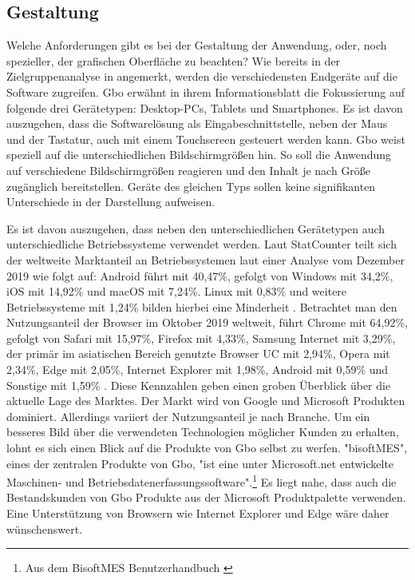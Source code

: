 \subsection{Gestaltung}
\label{subsec:gestaltung}
Welche Anforderungen gibt es bei der Gestaltung der Anwendung, oder, noch spezieller, 
der grafischen Oberfläche zu beachten? Wie bereits in der Zielgruppenanalyse in 
angemerkt, werden die verschiedensten Endgeräte auf die Software zugreifen.
Gbo erwähnt in ihrem Informationsblatt die Fokussierung auf folgende
drei Gerätetypen: Desktop-PCs, Tablets und Smartphones. Es ist davon auszugehen, dass die
Softwarelösung als Eingabeschnittstelle, neben der Maus und der Tastatur, auch mit einem Touchscreen
gesteuert werden kann. Gbo weist speziell auf die unterschiedlichen Bildschirmgrößen
hin. So soll die Anwendung auf verschiedene Bildschirmgrößen reagieren und den Inhalt je nach
Größe zugänglich bereitstellen. Geräte des gleichen Typs sollen keine signifikanten Unterschiede
in der Darstellung aufweisen.

Es ist davon auszugehen, dass neben den unterschiedlichen Gerätetypen auch unterschiedliche
Betriebssysteme verwendet werden. Laut StatCounter teilt sich der weltweite Marktanteil
an Betriebssystemen laut einer Analyse vom Dezember 2019 wie folgt auf: Android führt mit
40,47\%, gefolgt von Windows mit 34,2\%, iOS mit 14,92\% und macOS mit 7,24\%. Linux mit 0,83\% und weitere
Betriebssysteme mit 1,24\% bilden hierbei eine Minderheit \cite{StatCounterOSMarketShare}. Betrachtet man den
Nutzungsanteil der Browser im Oktober 2019 weltweit, führt Chrome mit 64,92\%, gefolgt von Safari mit 15,97\%,
Firefox mit 4,33\%, Samsung Internet mit 3,29\%, der primär im asiatischen Bereich genutzte Browser UC
mit 2,94\%, Opera mit 2,34\%, Edge mit 2,05\%, Internet Explorer mit 1,98\%, Android mit 0,59\% und Sonstige mit 1,59\% \cite{StatCounterBrowserMarketShare}.
Diese Kennzahlen geben einen groben Überblick über die aktuelle Lage des Marktes. Der Markt wird von
Google und Microsoft Produkten dominiert. Allerdings variiert der Nutzungsanteil je nach Branche.
Um ein besseres Bild über die verwendeten Technologien möglicher Kunden zu erhalten,
lohnt es sich einen Blick auf die Produkte von Gbo selbst zu werfen.
"bisoftMES", eines der zentralen Produkte von Gbo, "ist eine unter Microsoft.net
entwickelte Maschinen- und Betriebsdatenerfassungssoftware".\footnote{Aus dem BisoftMES Benutzerhandbuch \cite[S. 7]{BisoftMESHandbuch}}
Es liegt nahe, dass auch die Bestandskunden von Gbo Produkte aus der Microsoft
Produktpalette verwenden. Eine Unterstützung von Browsern wie Internet Explorer und Edge
wäre daher wünschenswert.

